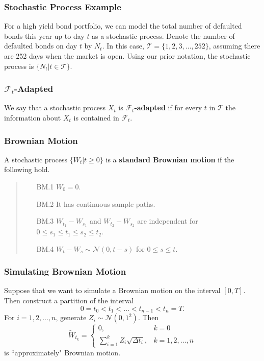 \documentclass{beamer}
\begin{document}
\begin{frame}
\frametitle{Stochastic Process Example}

\begin{Example}
For a high yield bond portfolio, we can model the total number of defaulted bonds this year up to day $t$ as a stochastic process. Denote the number of defaulted bonds on day $t$ by $N_t$. In this case, $\mathcal{T} = \{1, 2, 3,\ldots, 252\}$, assuming there are 252 days when the market is open. Using our prior notation, the stochastic process is $\{N_t | t\in\mathcal{T}\}$.
\end{Example}

\end{frame}

\begin{frame}

\frametitle{$\mathcal{F}_t$-Adapted}
\begin{Definition}
We say that a stochastic process $X_t$ is $\mathcal{F}_t${\bf-adapted} if for every $t$ in $\mathcal{T}$ the information about $X_t$ is contained in $\mathcal{F}_t$.
\end{Definition}
\end{frame}

\begin{frame}
\frametitle{Brownian Motion}
\begin{Definition}
A stochastic process $\{W_t | t\geq 0\}$ is a {\bf standard Brownian motion} if the following hold.
\medskip

\begin{quote}
\begin{enumerate}
\item[BM.1] $W_0 = 0$.
\item[BM.2] It has continuous sample paths.
\item[BM.3] $W_{t_1} - W_{s_1}$ and $W_{t_2} - W_{s_2}$ are independent for $0\leq s_1 \leq t_1 \leq s_2 \leq t_2$.
\item[BM.4] $W_t - W_s \sim{\mathcal{N}(0, t - s)}$ for $0\leq s \leq t$.
\end{enumerate}
\end{quote}
\end{Definition}
\end{frame}

\begin{frame}
\frametitle{Simulating Brownian Motion}
Suppose that we want to simulate a Brownian motion on the interval $[0, T]$. Then construct a partition of the interval
$$
0 = t_0 < t_1 <\ldots < t_{n - 1} < t_n = T.
$$
For $i = 1, 2,\ldots, n$, generate $Z_i\sim{\mathcal{N}(0, 1^2)}$. Then 
$$
\widetilde{W}_{t_k} = \begin{cases} 0	,	&	k = 0\\
						\sum_{i = 1}^k Z_i \sqrt{\Delta t_i},	&	k = 1, 2,\ldots, n
						\end{cases}
$$
is ``approximately" Brownian motion.
\end{frame}
\end{document}
